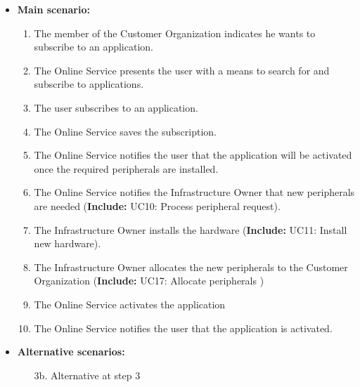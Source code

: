 \documentclass[english]{sareport}
\begin{document}
\begin{itemize}
        
    \item \textbf{Main scenario:} 
    \begin{enumerate}
       \item The member of the Customer Organization indicates he wants to subscribe to an application.
       \item The Online Service presents the user with a means to search for and subscribe to applications.
       \item The user subscribes to an application.
	\item The Online Service saves the subscription.
	\item The Online Service notifies the user that the application will be activated once the required peripherals are installed.
	\item The Online Service notifies the Infrastructure Owner that new peripherals are needed (\textbf{Include:} UC10: Process peripheral request).
	\item The Infrastructure Owner installs the hardware (\textbf{Include:} UC11: Install new hardware).
    \item The Infrastructure Owner allocates the new peripherals to the Customer Organization (\textbf{Include:} UC17: Allocate peripherals )
	\item The Online Service activates the application
	\item The Online Service notifies the user that the application is activated.
    \end{enumerate}

    \item \textbf{Alternative scenarios:} 
    \begin{enumerate}
        \item [3b.] Alternative at step 3
    \end{enumerate}
\end{itemize}
\end{document}
